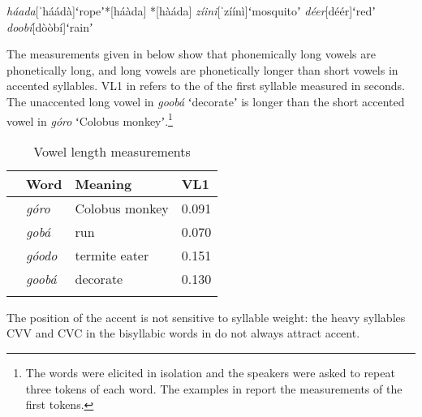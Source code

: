 \documentclass[output=paper]{LSP/langsci}
\begin{document}
\begin{exe}
	\ex \begin{xlist}
	\ex \textit{háada}\hspace{7mm}[ˈháádà]\hspace{4mm}ʻropeʼ\hspace{10mm}*[háàda] *[hàáda]
    \ex \textit{zíini}\hspace{10mm}[ˈzíínì]\hspace{6mm}ʻmosquitoʼ\hspace{3mm}
    \ex \textit{déer}\hspace{11mm}[déér]\hspace{7mm}ʻredʼ\hspace{12mm}
	\ex \textit{doobí}\hspace{9mm}[dòòbí]\hspace{5mm}ʻrainʼ\hspace{12mm}
    \end{xlist} \label{ex:Petrollino:nocontour}
\end{exe}

The measurements given in  below show that phonemically long vowels are phonetically long, and long vowels are phonetically longer than short vowels in accented syllables. VL1 in  refers to the  of the first syllable measured in seconds. The unaccented long vowel in \textit{goobá} ʻdecorateʼ is longer than the short accented vowel in \textit{góro} ʻColobus monkeyʼ.\footnote{The words were  elicited in isolation and the speakers were asked to repeat three tokens of each word. The examples in  report the measurements of the first tokens.}

\begin{table}
\caption{Vowel length measurements}
\label{tab:Petrollino:3}
 \begin{tabular}{llll}
  \lsptoprule
    & Word & Meaning & VL1\\
  \midrule
    &   \textit{góro} & Colobus monkey &  0.091\\
    &   \textit{gobá} & run & 0.070 \\
    &   \textit{góodo} & termite eater & 0.151\\
    &	\textit{goobá} & decorate & 0.130\\
  \lspbottomrule
 \end{tabular}
\end{table}

The position of the accent is not sensitive to syllable weight: the heavy syllables CVV and CVC in the bisyllabic words in  do not always attract accent.
\end{document}
